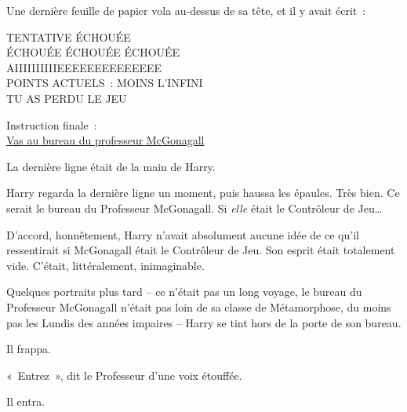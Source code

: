 Une dernière feuille de papier vola au-dessus de sa tête, et il y avait écrit~:

\begin{writtenNote}\centering
\begin{center}\scshape
TENTATIVE ÉCHOUÉE\\
ÉCHOUÉE ÉCHOUÉE ÉCHOUÉE\\
AIIIIIIIIIIEEEEEEEEEEEEEE\\
POINTS ACTUELS~: MOINS L'INFINI\\
\MakeUppercase{TU AS PERDU LE JEU}

Instruction finale~:\\
\underline{Vas au bureau du professeur McGonagall}
\end{center}
\end{writtenNote}

La dernière ligne était de la main de Harry.

Harry regarda la dernière ligne un moment, puis haussa les épaules. Très bien. Ce serait le bureau du Professeur McGonagall. Si \emph{elle} était le Contrôleur de Jeu…

D'accord, honnêtement, Harry n'avait absolument aucune idée de ce qu'il ressentirait si McGonagall était le Contrôleur de Jeu. Son esprit était totalement vide. C'était, littéralement, inimaginable.

Quelques portraits plus tard -- ce n'était pas un long voyage, le bureau du Professeur McGonagall n'était pas loin de sa classe de Métamorphose, du moins pas les Lundis des années impaires -- Harry se tint hors de la porte de son bureau.

Il frappa.

«~Entrez~», dit le Professeur d'une voix étouffée.

Il entra.

